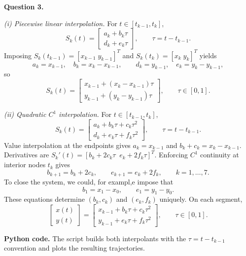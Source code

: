 \documentclass[11pt]{article}
\theoremstyle{definition}
\begin{document}
{\bf Question 3.}

\noindent\emph{(i) Piecewise linear interpolation.}
For \(t\in[t_{k-1},t_{k}]\),
\[
S_{k}(t)=\begin{bmatrix} a_{k}+b_{k}\tau \\ d_{k}+e_{k}\tau \end{bmatrix},\qquad \tau=t-t_{k-1}.
\]
Imposing \(S_{k}(t_{k-1})=[x_{k-1}\;y_{k-1}]^{T}\) and \(S_{k}(t_{k})=[x_{k}\;y_{k}]^{T}\) yields
\[
a_{k}=x_{k-1},\quad b_{k}=x_{k}-x_{k-1},\qquad d_{k}=y_{k-1},\quad e_{k}=y_{k}-y_{k-1},
\]
so
\[
S_{k}(t)=\begin{bmatrix} x_{k-1}+(x_{k}-x_{k-1})\tau \\ y_{k-1}+(y_{k}-y_{k-1})\tau \end{bmatrix},\qquad \tau\in[0,1].
\]

\noindent\emph{(ii) Quadratic \(C^{1}\) interpolation.}
For \(t\in[t_{k-1},t_{k}]\),
\[
S_{k}(t)=\begin{bmatrix} a_{k}+b_{k}\tau+c_{k}\tau^{2} \\ d_{k}+e_{k}\tau+f_{k}\tau^{2} \end{bmatrix},\qquad \tau=t-t_{k-1}.
\]
Value interpolation at the endpoints gives \(a_{k}=x_{k-1}\) and \(b_{k}+c_{k}=x_{k}-x_{k-1}\). Derivatives are \(S_{k}'(t)=[b_{k}+2c_{k}\tau\;\; e_{k}+2f_{k}\tau]^{T}\). Enforcing \(C^{1}\) continuity at interior nodes \(t_{k}\) gives
\[
b_{k+1}=b_{k}+2c_{k},\qquad e_{k+1}=e_{k}+2f_{k},\qquad k=1,\dots,7.
\]
To close the system, we could, for exampl,e impose that
\[
b_{1}=x_{1}-x_{0},\qquad e_{1}=y_{1}-y_{0}.
\]
These equations determine \((b_{k},c_{k})\) and \((e_{k},f_{k})\) uniquely. On each segment,
\[
\begin{bmatrix} x(t) \\ y(t) \end{bmatrix}=
\begin{bmatrix} x_{k-1}+b_{k}\tau+c_{k}\tau^{2} \\ y_{k-1}+e_{k}\tau+f_{k}\tau^{2} \end{bmatrix},\qquad \tau\in[0,1].
\]

\noindent\textbf{Python code.} The script builds both interpolants with the \(\tau=t-t_{k-1}\) convention and plots the resulting trajectories.
\end{document}
